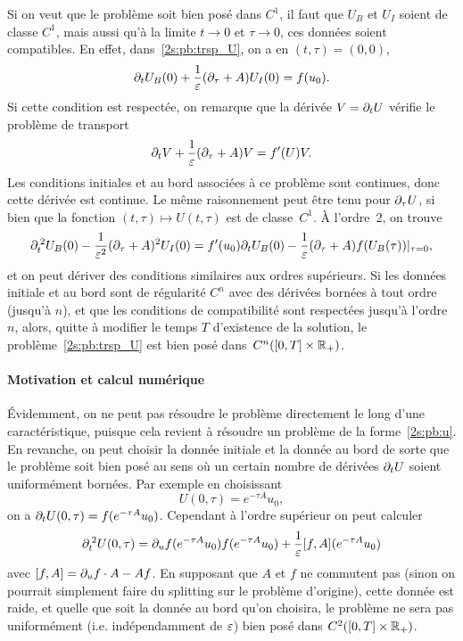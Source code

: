 Si on veut que le problème soit bien posé dans $C^1$, il faut que $U_B$ et $U_I$ soient de classe $C^1$, mais aussi qu'à la limite $t \rightarrow 0$ et $\tau \rightarrow 0$, ces données soient compatibles. En effet, dans~\eqref{2s:pb:trsp_U}, on a en $(t,\tau) = (0,0)$, 
\begin{equation*}
    \partial_t U_B(0) + \frac{1}{\varepsilon}(\partial_\tau + A)U_I(0) = f(u_0) .
\end{equation*}
Si cette condition est respectée, on remarque que la dérivée $V = \partial_t U$ vérifie le problème de transport 
\begin{equation*}
    \partial_t V + \frac{1}{\varepsilon}(\partial_\tau + A) V = f'(U)V .
\end{equation*}
Les conditions initiales et au bord associées à ce problème sont continues, donc cette dérivée est continue. Le même raisonnement peut être tenu pour $\partial_\tau U$, si bien que la fonction $(t,\tau) \mapsto U(t,\tau)$ est de classe~$C^1$. À l'ordre~2, on trouve
\begin{equation*}
    \partial_t^{\: 2} U_B(0) - \frac{1}{\varepsilon^2}(\partial_\tau + A)^2 U_I(0)
    = f'(u_0)\partial_t U_B(0) 
        - \frac{1}{\varepsilon}(\partial_\tau + A) f(U_B(\tau))|_{\tau = 0} ,
\end{equation*}
et on peut dériver des conditions similaires aux ordres supérieurs. Si les données initiale et au bord sont de régularité $C^n$ avec des dérivées bornées à tout ordre (jusqu'à $n$), et que les conditions de compatibilité sont respectées jusqu'à l'ordre $n$, alors, quitte à modifier le temps $T$ d'existence de la solution, le problème~\eqref{2s:pb:trsp_U} est bien posé dans~$C^n([0,T] \times \mathbb{R}_+)$.

\paragraph{Motivation et calcul numérique\\}

Évidemment, on ne peut pas résoudre le problème directement le long d'une caractéristique, puisque cela revient à résoudre un problème de la forme~\eqref{2s:pb:u}. En revanche, on peut choisir la donnée initiale et la donnée au bord de sorte que le problème soit bien posé au sens où un certain nombre de dérivées $\partial_t U$ soient uniformément bornées. Par exemple en choisissant 
\begin{equation*}
    U(0,\tau) = e^{-\tau A} u_0 ,
\end{equation*}
on a $\partial_t U (0,\tau) = f(e^{-\tau A} u_0)$. Cependant à l'ordre supérieur on peut calculer 
\begin{equation*}
    \partial_t^{\:2}U(0,\tau) = \partial_u f(e^{-\tau A}u_0)f(e^{-\tau A}u_0) + \frac{1}{\varepsilon} [f,A](e^{-\tau A} u_0) 
\end{equation*}
avec $[f,A] = \partial_u f \cdot A - A f$. En supposant que $A$ et $f$ ne commutent pas (sinon on pourrait simplement faire du splitting sur le problème d'origine), cette donnée est raide, et quelle que soit la donnée au bord qu'on choisira, le problème ne sera pas uniformément (i.e. indépendamment de $\varepsilon$) bien posé dans $C^2([0,T] \times \mathbb{R}_+)$. 

